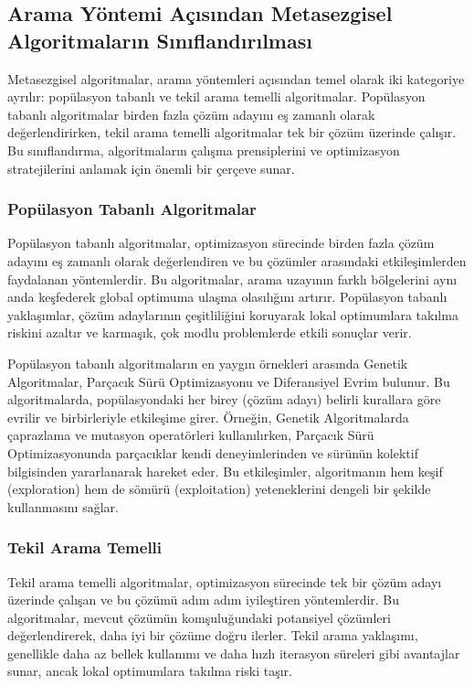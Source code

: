 \subsection{Arama Yöntemi Açısından Metasezgisel Algoritmaların Sınıflandırılması}
Metasezgisel algoritmalar, arama yöntemleri açısından temel olarak iki kategoriye ayrılır: popülasyon tabanlı ve tekil arama temelli algoritmalar. Popülasyon tabanlı algoritmalar birden fazla çözüm adayını eş zamanlı olarak değerlendirirken, tekil arama temelli algoritmalar tek bir çözüm üzerinde çalışır. Bu sınıflandırma, algoritmaların çalışma prensiplerini ve optimizasyon stratejilerini anlamak için önemli bir çerçeve sunar.

\subsubsection{Popülasyon Tabanlı Algoritmalar}
Popülasyon tabanlı algoritmalar, optimizasyon sürecinde birden fazla çözüm adayını eş zamanlı olarak değerlendiren ve bu çözümler arasındaki etkileşimlerden faydalanan yöntemlerdir. Bu algoritmalar, arama uzayının farklı bölgelerini aynı anda keşfederek global optimuma ulaşma olasılığını artırır. Popülasyon tabanlı yaklaşımlar, çözüm adaylarının çeşitliliğini koruyarak lokal optimumlara takılma riskini azaltır ve karmaşık, çok modlu problemlerde etkili sonuçlar verir.

Popülasyon tabanlı algoritmaların en yaygın örnekleri arasında Genetik Algoritmalar, Parçacık Sürü Optimizasyonu ve Diferansiyel Evrim bulunur. Bu algoritmalarda, popülasyondaki her birey (çözüm adayı) belirli kurallara göre evrilir ve birbirleriyle etkileşime girer. Örneğin, Genetik Algoritmalarda çaprazlama ve mutasyon operatörleri kullanılırken, Parçacık Sürü Optimizasyonunda parçacıklar kendi deneyimlerinden ve sürünün kolektif bilgisinden yararlanarak hareket eder. Bu etkileşimler, algoritmanın hem keşif (exploration) hem de sömürü (exploitation) yeteneklerini dengeli bir şekilde kullanmasını sağlar.


\subsubsection{Tekil Arama Temelli}

Tekil arama temelli algoritmalar, optimizasyon sürecinde tek bir çözüm adayı üzerinde çalışan ve bu çözümü adım adım iyileştiren yöntemlerdir. Bu algoritmalar, mevcut çözümün komşuluğundaki potansiyel çözümleri değerlendirerek, daha iyi bir çözüme doğru ilerler. Tekil arama yaklaşımı, genellikle daha az bellek kullanımı ve daha hızlı iterasyon süreleri gibi avantajlar sunar, ancak lokal optimumlara takılma riski taşır.

